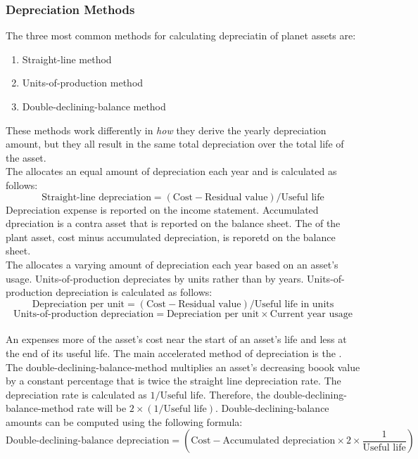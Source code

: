 \documentclass{article}
\begin{document}
\subsubsection{Depreciation Methods}

The three most common methods for calculating depreciatin of planet assets are: 
\begin{enumerate}
  \item Straight-line method 
  \item Units-of-production method 
  \item Double-declining-balance method
\end{enumerate}
These methods work differently in \emph{how} they derive the yearly depreciation amount, but they all result in the same total depreciation over the total life of the asset. \\ 

The  allocates an equal amount of depreciation each year and is calculated as follows: $$\textrm{Straight-line depreciation} = (\textrm{Cost} - \textrm{Residual value}) / \textrm{Useful life}$$ Depreciation expense is reported on the income statement. Accumulated dpreciation is a contra asset that is reported on the balance sheet. The  of the plant asset, cost minus accumulated depreciation, is reporetd on the balance sheet. \\ 

The  allocates a varying amount of depreciation each year based on an asset's usage. Units-of-production depreciates by units rather than by years. Units-of-production depreciation is calculated as follows: $$\textrm{Depreciation per unit} = (\textrm{Cost} - \textrm{Residual value}) / \textrm{Useful life in units}$$ $$\textrm{Units-of-production depreciation} = \textrm{Depreciation per unit} \times \textrm{Current year usage}$$ \\ 

An  expenses more of the asset's cost near the start of an asset's life and less at the end of its useful life. The main accelerated method of depreciation is the . The double-declining-balance-method multiplies an asset's decreasing boook value by a constant percentage that is twice the straight line depreciation rate. The depreciation rate is calculated as $1 / \textrm{Useful life}$. Therefore, the double-declining-balance-method rate will be $2 \times (1 / \textrm{Useful life})$. Double-declining-balance amounts can be computed using the following formula: $$\textrm{Double-declining-balance depreciation} = (\textrm{Cost} - \textrm{Accumulated depreciation} \times 2 \times \frac{1}{\textrm{Useful life}})$$
\end{document}
